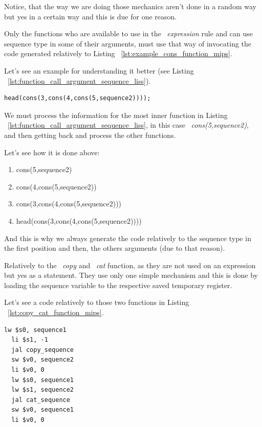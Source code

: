 \documentclass[
  oneside,
  11pt, a4paper,
  footinclude=true,
  headinclude=true,
  cleardoublepage=empty
]{scrbook}
\begin{document}
Notice, that the way we are doing those mechanics aren't done in a random way but yes in a certain way and this is due for one reason.

Only the functions who are available to use in the ~\textit{expression} rule and can use sequence type in some of their arguments, must use that way of invocating the code generated relatively to Listing ~\ref{lst:example_cons_function_mips}.

Let's see an example for understanding it better (see Listing ~\ref{lst:function_call_argument_sequence_liss}).

\begin{lstlisting}[caption={Example of using a function call as argument},label={lst:function_call_argument_sequence_liss}]
  head(cons(3,cons(4,cons(5,sequence2))));
\end{lstlisting}

We must process the information for the most inner function in Listing ~\ref{lst:function_call_argument_sequence_liss}, in this case ~\textit{cons(5,sequence2)}, and then getting back and process the other functions.

Let's see how it is done above:

\begin{enumerate}
\item cons(5,sequence2)
\item cons(4,cons(5,sequence2))
\item cons(3,cons(4,cons(5,sequence2)))
\item head(cons(3,cons(4,cons(5,sequence2))))
\end{enumerate}
 
And this is why we always generate the code relatively to the sequence type in the first position and then, the others arguments (due to that reason).

Relatively to the ~\textit{copy} and ~\textit{cat} function, as they are not used on an expression but yes as a statement. They use only one simple mechanism and this is done by loading the sequence variable to the respective saved temporary register.

Let's see a code relatively to those two functions in Listing ~\ref{lst:copy_cat_function_mips}.

\begin{lstlisting}[caption={Example of code generated for copy and cat statement},label={lst:copy_cat_function_mips}]
  lw $s0, sequence1		
  li $s1, -1		
  jal copy_sequence
  sw $v0, sequence2		
  li $v0, 0
  lw $s0, sequence1		
  lw $s1, sequence2		
  jal cat_sequence
  sw $v0, sequence1		
  li $v0, 0
\end{lstlisting}
\end{document}
